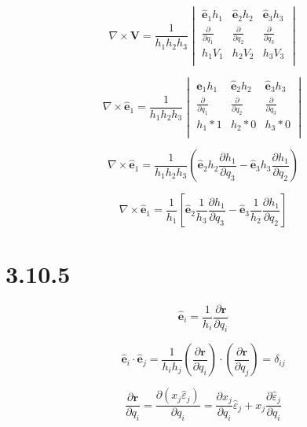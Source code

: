 \documentclass[12pt]{article}
\begin{document}
\[
    \nabla \times \textbf{V} = \frac{1}{h_1 h_2 h_3}
    \begin{vmatrix}
        \hat{\textbf{e}}_1 h_1        & \hat{\textbf{e}}_2 h_2        & \hat{\textbf{e}}_3 h_3        \\
        \frac{\partial}{\partial q_1} & \frac{\partial}{\partial q_2} & \frac{\partial}{\partial q_3} \\
        h_1 V_1                       & h_2 V_2                       & h_3 V_3                       \\
    \end{vmatrix}
\]

\[
    \nabla \times \hat{\textbf{e}}_1 = \frac{1}{h_1 h_2 h_3}
    \begin{vmatrix}
        \hat{\textbf{e}}_1 h_1        & \hat{\textbf{e}}_2 h_2        & \hat{\textbf{e}}_3 h_3        \\
        \frac{\partial}{\partial q_1} & \frac{\partial}{\partial q_2} & \frac{\partial}{\partial q_3} \\
        h_1*1                         & h_2*0                         & h_3*0                         \\
    \end{vmatrix}
\]

\[
    \nabla \times \hat{\textbf{e}}_1 = \frac{1}{h_1 h_2 h_3}\left(\hat{\textbf{e}}_2 h_2 \frac{\partial h_1}{\partial q_3} - \hat{\textbf{e}}_3 h_3 \frac{\partial h_1}{\partial q_2} \right)
\]

\[
    \nabla \times \hat{\textbf{e}}_1 = \frac{1}{h_1}\left[\hat{\textbf{e}}_2 \frac{1}{h_3} \frac{\partial h_1}{\partial q_3} - \hat{\textbf{e}}_3  \frac{1}{h_2}  \frac{\partial h_1}{\partial q_2} \right]
\]

\section{3.10.5}

\[
    \hat{\textbf{e}}_i = \frac{1}{h_i} \frac{\partial \textbf{r}}{\partial q_i}
\]

\[
    \hat{\textbf{e}}_i \cdot \hat{\textbf{e}}_j = \frac{1}{h_i h_j} \left(\frac{\partial \textbf{r}}{\partial q_i}\right) \cdot \left(\frac{\partial \textbf{r}}{\partial q_j}\right)  = \delta_{ij}
\]

\[
    \frac{\partial \textbf{r}}{\partial q_i} = \frac{\partial (x_j \hat{\varepsilon}_j)}{\partial q_i} = \frac{\partial x_j}{\partial q_i} \hat{\varepsilon}_j + x_j \frac{\partial \hat{\varepsilon}_j}{\partial q_i}
\]
\end{document}
